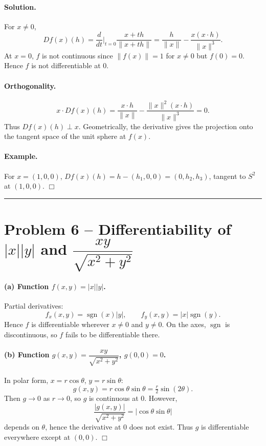 \documentclass[12pt,a4paper]{article}
\theoremstyle{plain}
\theoremstyle{definition}
\theoremstyle{remark}
\theoremstyle{remark}
\begin{document}
\paragraph{Solution.}
For $x\ne0$,
\[
Df(x)(h)=\frac{d}{dt}\bigg|_{t=0}\frac{x+th}{\|x+th\|}
=\frac{h}{\|x\|}-\frac{x(x\cdot h)}{\|x\|^3}.
\]
At $x=0$, $f$ is not continuous since $\|f(x)\|=1$ for $x\ne0$ but $f(0)=0$.
Hence $f$ is not differentiable at $0$.

\paragraph{Orthogonality.}
\[
x\cdot Df(x)(h)=\frac{x\cdot h}{\|x\|}-\frac{\|x\|^2(x\cdot h)}{\|x\|^3}=0.
\]
Thus $Df(x)(h)\perp x$. Geometrically, the derivative gives the projection onto the tangent space of the unit sphere at $f(x)$.

\paragraph{Example.}
For $x=(1,0,0)$, $Df(x)(h)=h-(h_1,0,0)=(0,h_2,h_3)$, tangent to $S^2$ at $(1,0,0)$.
\hfill$\Box$

\bigskip\hrule\bigskip

\section*{Problem 6 -- Differentiability of $|x||y|$ and $\dfrac{xy}{\sqrt{x^2+y^2}}$}

\paragraph{(a) Function $f(x,y)=|x||y|$.}
Partial derivatives:
\[
f_x(x,y)=\operatorname{sgn}(x)|y|,\qquad
f_y(x,y)=|x|\operatorname{sgn}(y).
\]
Hence $f$ is differentiable wherever $x\ne0$ and $y\ne0$.
On the axes, $\operatorname{sgn}$ is discontinuous, so $f$ fails to be differentiable there.

\paragraph{(b) Function $g(x,y)=\dfrac{xy}{\sqrt{x^2+y^2}}$, $g(0,0)=0$.}
In polar form, $x=r\cos\theta$, $y=r\sin\theta$:
\[
g(x,y)=r\cos\theta\sin\theta=\tfrac{r}{2}\sin(2\theta).
\]
Then $g\to0$ as $r\to0$, so $g$ is continuous at $0$.
However,
\[
\frac{|g(x,y)|}{\sqrt{x^2+y^2}}=|\cos\theta\sin\theta|
\]
depends on $\theta$, hence the derivative at $0$ does not exist.
Thus $g$ is differentiable everywhere except at $(0,0)$.
\hfill$\Box$
\end{document}

